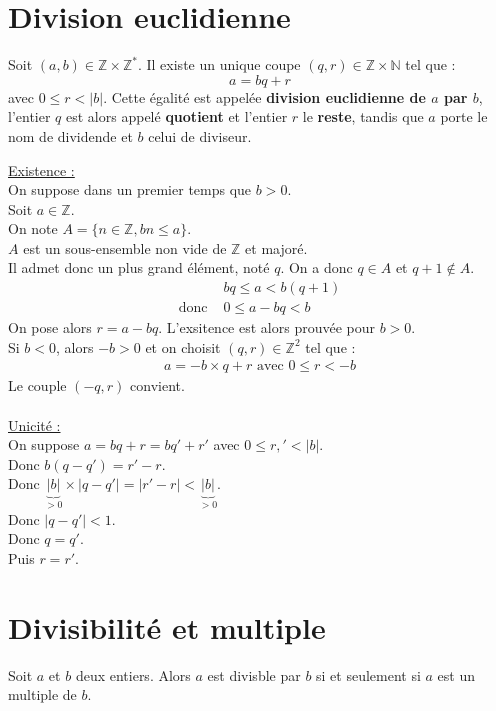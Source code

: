 \documentclass[../main.tex]{subfiles}
\begin{document}
\section{Division euclidienne}
\begin{tcolorbox}[title=Théorème 12.4, title filled=false, colframe=orange, colback=orange!10!white]
    Soit $(a,b) \in \mathbb{Z} \times \mathbb{Z}^*$. Il existe un unique coupe $(q,r) \in \mathbb{Z} \times \mathbb{N}$ tel que :
    $$a = bq + r$$
    avec $0 \leq r < |b|$. Cette égalité est appelée \textbf{division euclidienne de $a$ par $b$}, l'entier $q$ est alors appelé \textbf{quotient} et l'entier $r$ le \textbf{reste}, tandis que $a$ porte le nom de dividende et $b$ celui de diviseur. 
\end{tcolorbox}
\underline{Existence :} \\
On suppose dans un premier temps que $b > 0$. \\
Soit $a \in \mathbb{Z}$. \\
On note $A = \{ n \in \mathbb{Z}, bn \leq a \}$. \\
$A$ est un sous-ensemble non vide de $\mathbb{Z}$ et majoré. \\
Il admet donc un plus grand élément, noté $q$. 
On a donc $q \in A$ et $q + 1 \not \in A$. 
\begin{align*}
    &bq \leq a < b(q + 1) \\
    \text{donc } &0 \leq a - bq < b
\end{align*}
On pose alors $r = a - bq$. L'exsitence est alors prouvée pour $b > 0$. \\
Si $b < 0$, alors $-b > 0$ et on choisit $(q,r) \in \mathbb{Z}^2$ tel que :
\begin{align*}
    a = -b \times q + r \text{ avec } 0 \leq r < -b
\end{align*}
Le couple $(-q, r)$ convient. \\ \\

\underline{Unicité :} \\
On suppose $a = bq + r = bq' + r'$ avec $0 \leq r, ' < |b|$. \\
Donc $b(q-q') = r' - r$. \\
Donc $\underbrace{|b|}_{> 0} \times |q - q'| = |r' - r| < \underbrace{|b|}_{> 0}$. \\
Donc $|q - q'| < 1$. \\
Donc $q = q'$. \\
Puis $r = r'$. 

\setcounter{section}{8}
\section{Divisibilité et multiple}
\begin{tcolorbox}[title=Propostion 12.9, title filled=false, colframe=lightblue, colback=lightblue!10!white]
    Soit $a$ et $b$ deux entiers. Alors $a$ est divisble par $b$ si et seulement si $a$ est un multiple de $b$.
\end{tcolorbox}
\end{document}
